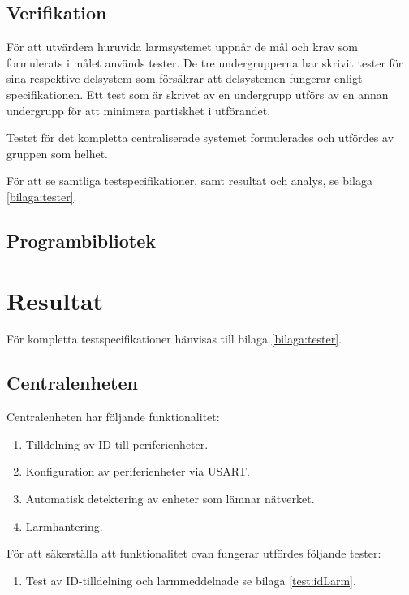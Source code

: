 \documentclass{article}
\begin{document}
\subsection{Verifikation}
\label{verifikation}
För att utvärdera huruvida larmsystemet uppnår de mål och krav som formulerats i målet används tester.
De tre undergrupperna har skrivit tester för sina respektive delsystem som försäkrar att
delsystemen fungerar enligt specifikationen. Ett test som är skrivet av en undergrupp utförs
av en annan undergrupp för att minimera partiskhet i utförandet.

Testet för det kompletta centraliserade systemet formulerades och utfördes av gruppen som helhet.

För att se samtliga testspecifikationer, samt resultat och analys, se bilaga \ref{bilaga:tester}.


\subsection{Programbibliotek}
\label{stm}



 \section{Resultat}
 För kompletta testspecifikationer hänvisas till bilaga \ref{bilaga:tester}.

 \subsection{Centralenheten}
 Centralenheten har följande funktionalitet:
 \begin{enumerate}
     \item Tilldelning av ID till periferienheter.
     \item Konfiguration av periferienheter via USART.
     \item Automatisk detektering av enheter som lämnar nätverket.
     \item Larmhantering.
 \end{enumerate}
 För att säkerställa att funktionalitet ovan fungerar utfördes följande tester:
 \begin{enumerate}
     \item Test av ID-tilldelning och larmmeddelnade se bilaga \ref{test:idLarm}.
 \end{enumerate}
 
\end{document}
